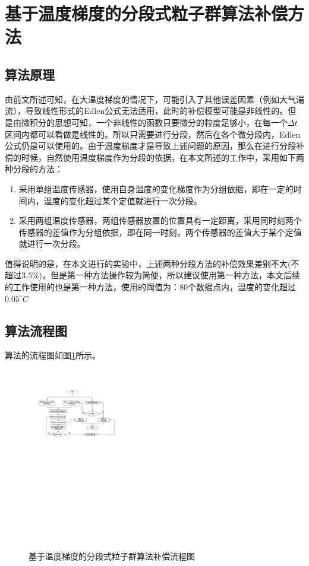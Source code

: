 \section{基于温度梯度的分段式粒子群算法补偿方法}
\subsection{算法原理}
由前文所述可知，在大温度梯度的情况下，可能引入了其他误差因素（例如大气湍流），导致线性形式的Edlen公式无法适用，此时的补偿模型可能是非线性的。但是由微积分的思想可知，一个非线性的函数只要微分的粒度足够小，在每一个$\Delta t$区间内都可以看做是线性的。所以只需要进行分段，然后在各个微分段内，Edlen公式仍是可以使用的。由于温度梯度才是导致上述问题的原因，那么在进行分段补偿的时候，自然使用温度梯度作为分段的依据，在本文所述的工作中，采用如下两种分段的方法：
\begin{enumerate}
  \item 采用单组温度传感器，使用自身温度的变化梯度作为分组依据，即在一定的时间内，温度的变化超过某个定值就进行一次分段。
  \item 采用两组温度传感器，两组传感器放置的位置具有一定距离，采用同时刻两个传感器的差值作为分组依据，即在同一时刻，两个传感器的差值大于某个定值就进行一次分段。
\end{enumerate}

值得说明的是，在本文进行的实验中，上述两种分段方法的补偿效果差别不大(不超过$3.5\%$)，但是第一种方法操作较为简便，所以建议使用第一种方法，本文后续的工作使用的也是第一种方法，使用的阈值为：80个数据点内，温度的变化超过$0.05^{\circ}C$

\subsection{算法流程图}
\label{基于温度梯度的分段式粒子群算法补偿流程图}
算法的流程图如图\ref{fig:基于温度梯度的分段式粒子群算法补偿流程图}所示。
\begin{figure}[htb]
  \centering
  \includegraphics[width=12cm]{fig/4-fig/基于温度梯度的分段式粒子群算法流程图.drawio.pdf}
  \caption{基于温度梯度的分段式粒子群算法补偿流程图}
  \label{fig:基于温度梯度的分段式粒子群算法补偿流程图}
\end{figure}

